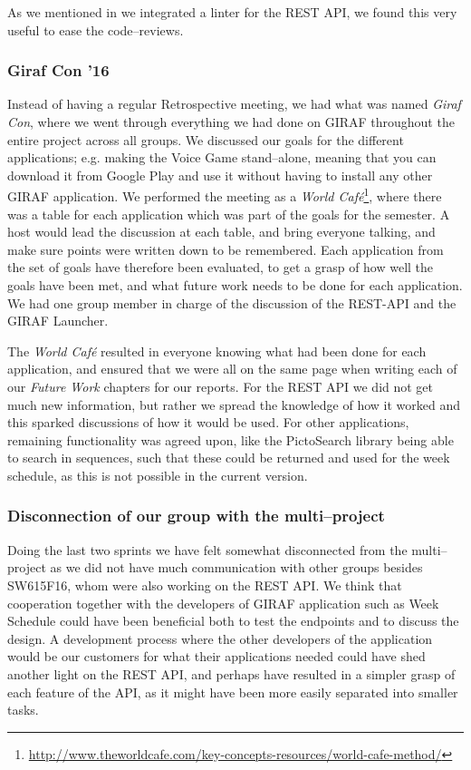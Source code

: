 As we mentioned in  we integrated a linter for the REST API, we found this very useful to ease the code--reviews.

\subsubsection*{Giraf Con '16}
Instead of having a regular Retrospective meeting, we had what was named \textit{Giraf Con}, where we went through everything we had done on GIRAF throughout the entire project across all groups.
We discussed our goals for the different applications; e.g. making the Voice Game stand--alone, meaning that you can download it from Google Play and use it without having to install  any other GIRAF application.
We performed the meeting as a \textit{World Café}\footnote{\url{http://www.theworldcafe.com/key-concepts-resources/world-cafe-method/}}, where there was a table for each application which was part of the goals for the semester.
A host would lead the discussion at each table, and bring everyone talking, and make sure points were written down to be remembered.
Each application from the set of goals have therefore been evaluated, to get a grasp of how well the goals have been met, and what future work needs to be done for each application.
We had one group member in charge of the discussion of the REST-API and the GIRAF Launcher.

The \textit{World Café} resulted in everyone knowing what had been done for each application, and ensured that we were all on the same page when writing each of our \textit{Future Work} chapters for our reports.
For the REST API we did not get much new information, but rather we spread the knowledge of how it worked and this sparked discussions of how it would be used.
For other applications, remaining functionality was agreed upon, like the PictoSearch library being able to search in sequences, such that these could be returned and used for the week schedule, as this is not possible in the current version.

\subsubsection*{Disconnection of our group with the multi–project}
Doing the last two sprints we have felt somewhat disconnected from the multi--project as we did not have much communication with other groups besides SW615F16, whom were also working on the REST API.
We think that cooperation together with the developers of GIRAF application such as Week Schedule could have been beneficial both to test the endpoints and to discuss the design.
A development process where the other developers of the application would be our customers for what their applications needed could have shed another light on the REST API, and perhaps have resulted in a simpler grasp of each feature of the API, as it might have been more easily separated into smaller tasks.

